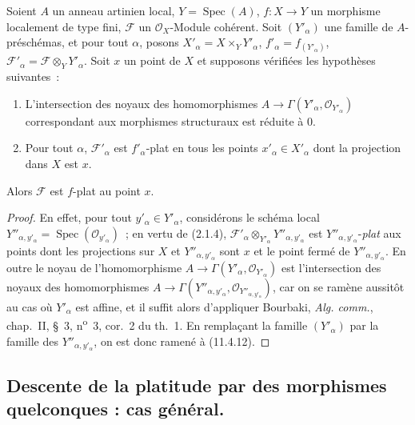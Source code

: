 \begin{corollary}[11.4.13]
\label{IV.11.4.13-fr}
Soient $A$ un anneau artinien local, $Y=\operatorname{Spec}(A)$,
$f:X\to Y$ un morphisme localement de type fini, $\mathcal F$ un
$\mathcal O_X$-Module cohérent. Soit $(Y'_\alpha)$ une famille de
$A$-préschémas, et pour tout $\alpha$, posons
$X'_\alpha=X\times_Y Y'_\alpha$, $f'_\alpha=f_{(Y'_\alpha)}$,
$\mathcal F'_\alpha=\mathcal F\otimes_Y Y'_\alpha$. Soit $x$ un point de $X$ et
supposons vérifiées les hypothèses suivantes~:
\begin{enumerate}[label=\textup{(\roman*)}]
  \item L'intersection des noyaux des homomorphismes
  $A\to\Gamma(Y'_\alpha,\mathcal O_{Y'_\alpha})$ correspondant aux morphismes
  structuraux est réduite à $0$.
  \item Pour tout $\alpha$, $\mathcal F'_\alpha$ est $f'_\alpha$-plat en \textup{tous}
  les points $x'_\alpha\in X'_\alpha$ dont la projection dans $X$ est $x$.
\end{enumerate}

Alors $\mathcal F$ est $f$-plat au point $x$.
\end{corollary}

\begin{proof}
En effet, pour tout $y'_\alpha\in Y'_\alpha$, considérons le schéma local
$Y''_{\alpha,y'_\alpha}=\operatorname{Spec}(\mathcal O_{y'_\alpha})$~;
en vertu de (2.1.4),
$\mathcal F'_\alpha\otimes_{Y'_\alpha}Y''_{\alpha,y'_\alpha}$ est
$Y''_{\alpha,y'_\alpha}$-\emph{plat} aux points dont les projections sur $X$ et
$Y''_{\alpha,y'_\alpha}$ sont $x$ et le point fermé de
$Y''_{\alpha,y'_\alpha}$. En outre le noyau de l'homomorphisme
$A\to\Gamma(Y'_\alpha,\mathcal O_{Y'_\alpha})$ est l'intersection des noyaux
des homomorphismes
$A\to\Gamma(Y''_{\alpha,y'_\alpha},\mathcal O_{Y''_{\alpha,y'_\alpha}})$, car
on se ramène aussitôt au cas où $Y'_\alpha$ est affine, et il suffit alors
d'appliquer Bourbaki, \emph{Alg. comm.}, chap.~II, \S~3, n\textsuperscript{o}~3, cor.~2 du
th.~1. En remplaçant la famille $(Y'_\alpha)$ par la famille des
$Y''_{\alpha,y'_\alpha}$, on est donc ramené à (11.4.12).
\end{proof}

\subsection{Descente de la platitude par des morphismes quelconques : cas général.}
\label{subsection:IV.11.5-fr}

